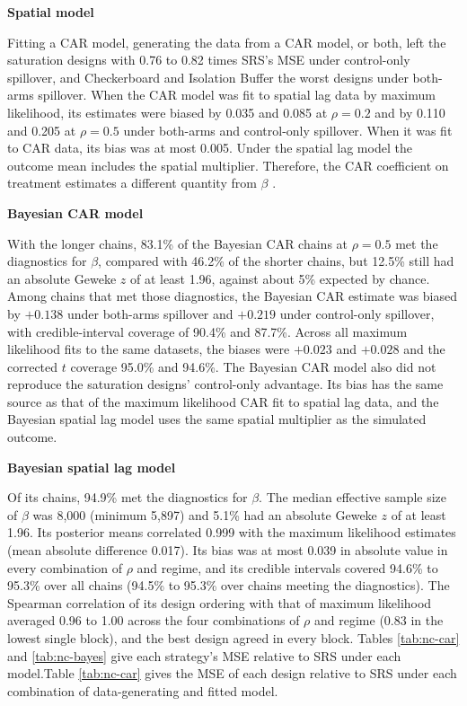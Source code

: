 \documentclass[11pt]{article}
\newcommand{\sihead}[1]{\par\medskip\noindent\textbf{#1}\par\nopagebreak\noindent\ignorespaces}
\begin{document}
\sihead{Spatial model}
Fitting a CAR model, generating the data from a CAR model, or both, left the saturation designs with 0.76 to 0.82 times SRS's MSE under control-only spillover, and Checkerboard and Isolation Buffer the worst designs under both-arms spillover. When the CAR model was fit to spatial lag data by maximum likelihood, its estimates were biased by 0.035 and 0.085 at $\rho = 0.2$ and by 0.110 and 0.205 at $\rho = 0.5$ under both-arms and control-only spillover. When it was fit to CAR data, its bias was at most 0.005. Under the spatial lag model the outcome mean includes the spatial multiplier. Therefore, the CAR coefficient on treatment estimates a different quantity from $\beta$ \citep{wall_close_2004}.

\sihead{Bayesian CAR model}
With the longer chains, 83.1\% of the Bayesian CAR chains at $\rho=0.5$ met the diagnostics for $\beta$, compared with 46.2\% of the shorter chains, but 12.5\% still had an absolute Geweke $z$ of at least 1.96, against about 5\% expected by chance. Among chains that met those diagnostics, the Bayesian CAR estimate was biased by $+0.138$ under both-arms spillover and $+0.219$ under control-only spillover, with credible-interval coverage of 90.4\% and 87.7\%. Across all maximum likelihood fits to the same datasets, the biases were $+0.023$ and $+0.028$ and the corrected $t$ coverage 95.0\% and 94.6\%. The Bayesian CAR model also did not reproduce the saturation designs' control-only advantage. Its bias has the same source as that of the maximum likelihood CAR fit to spatial lag data, and the Bayesian spatial lag model uses the same spatial multiplier as the simulated outcome.

\sihead{Bayesian spatial lag model}
Of its chains, 94.9\% met the diagnostics for $\beta$. The median effective sample size of $\beta$ was 8,000 (minimum 5,897) and 5.1\% had an absolute Geweke $z$ of at least 1.96. Its posterior means correlated 0.999 with the maximum likelihood estimates (mean absolute difference 0.017). Its bias was at most 0.039 in absolute value in every combination of $\rho$ and regime, and its credible intervals covered 94.6\% to 95.3\% over all chains (94.5\% to 95.3\% over chains meeting the diagnostics). The Spearman correlation of its design ordering with that of maximum likelihood averaged 0.96 to 1.00 across the four combinations of $\rho$ and regime (0.83 in the lowest single block), and the best design agreed in every block. \iffullsi Tables \ref{tab:nc-car} and \ref{tab:nc-bayes} give each strategy's MSE relative to SRS under each model.\else Table \ref{tab:nc-car} gives the MSE of each design relative to SRS under each combination of data-generating and fitted model.\fi
\end{document}
